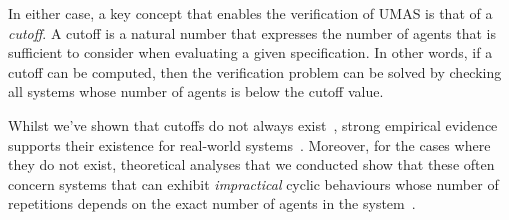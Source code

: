 \documentclass{article}
\begin{document}
In either case, a key concept that enables the verification of UMAS 
is that of a {\em cutoff}.  A cutoff is a natural number that expresses
the number of agents that is sufficient to consider when evaluating a given 
specification. In other words, if a cutoff can be computed, then the
verification problem can be solved by checking all systems whose number of
agents is below the cutoff value.



Whilst we've shown that cutoffs do not always exist~\cite{KouvarosLomuscio13b},
strong empirical evidence supports their existence for real-world
systems~\cite{EmersonKahlon00,EmersonNamjoshi95,Benjamin+14}. Moreover, for the
cases where they do not exist, theoretical analyses that we conducted show that
these often concern systems that can exhibit {\em impractical} cyclic behaviours
whose number of repetitions depends on the exact number of agents in the
system~\cite{KouvarosLomuscio13b}.

\end{document}

